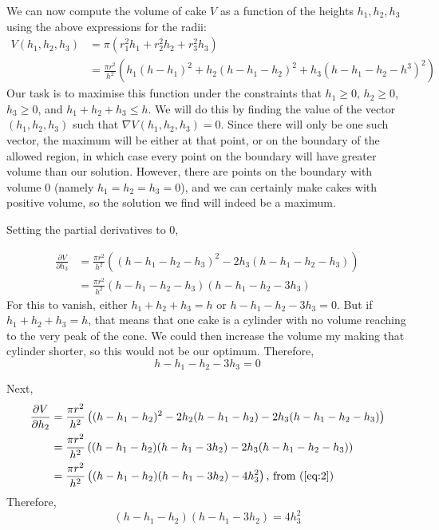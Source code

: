\documentclass[12pt]{article}
\begin{document}
We can now compute the volume of cake $V$ as a function of the heights $h_1, h_2, h_3$ using the above expressions for the radii:
\begin{align*}
  V(h_1, h_2, h_3) &= \pi (r_1^2 h_1 + r_2^2 h_2 + r_3^2 h_3) \\
  &= \frac{\pi r^2}{h^2}(h_1 (h - h_1)^2 + h_2(h - h_1 - h_2)^2 + h_3(h - h_1 - h_2 - h^3)^2)
\end{align*}
Our task is to maximise this function under the constraints that $h_1 \geq 0$, $h_2 \geq 0$, $h_3 \geq 0$, and $h_1 + h_2 + h_3 \leq h$. We will do this by finding the value of the vector $(h_1, h_2, h_3)$ such that $\nabla V(h_1, h_2, h_3) = 0$. Since there will only be one such vector, the maximum will be either at that point, or on the boundary of the allowed region, in which case every point on the boundary will have greater volume than our solution. However, there are points on the boundary with volume 0 (namely $h_1 = h_2 = h_3 = 0$), and we can certainly make cakes with positive volume, so the solution we find will indeed be a maximum.

Setting the partial derivatives to 0,

\begin{align*}
  \frac{\partial V}{\partial h_3} &= \frac{\pi r^2}{h^2} \left( (h - h_1 - h_2 - h_3)^2 - 2h_3(h - h_1 - h_2 - h_3) \right) \\
  &= \frac{\pi r^2}{h^2}(h - h_1 - h_2 - h_3)(h - h_1 - h_2 - 3h_3)
\end{align*}
For this to vanish, either $h_1 + h_2 + h_3 = h$ or $h - h_1 - h_2 - 3h_3 = 0$. But if $h_1 + h_2 + h_3 = h$, that means that one cake is a cylinder with no volume reaching to the very peak of the cone. We could then increase the volume my making that cylinder shorter, so this would not be our optimum. Therefore,
\begin{equation}
  \label{eq:2}
  h - h_1 - h_2 - 3h_3 = 0
\end{equation}

Next,
\begin{align*}
  \frac{\partial V}{\partial h_2} &= \frac{\pi r^2}{h^2} \left( (h - h_1 - h_2)^2 - 2h_2 (h - h_1 - h_2) - 2h_3(h - h_1 - h_2 - h_3) \right) \\
                                  &= \frac{\pi r^2}{h^2} \left( (h - h_1 - h_2)(h - h_1 - 3h_2) - 2h_3 (h - h_1 -h_2 - h_3) \right) \\
  &= \frac{\pi r^2}{h^2} \left( (h - h_1 - h_2)(h - h_1 - 3h_2) - 4h_3^2 \right) \text{, from (\ref{eq:2})}\\
\end{align*}
Therefore,
\begin{equation}
  \label{eq:3}
  (h-h_1 - h_2)(h-h_1-3h_2) = 4h_3^2
\end{equation}
\end{document}
